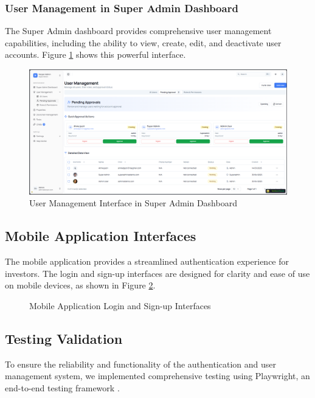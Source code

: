 \subsubsection{User Management in Super Admin Dashboard}
The Super Admin dashboard provides comprehensive user management capabilities, including the ability to view, create, edit, and deactivate user accounts. Figure \ref{fig:user-management} shows this powerful interface.
\newpage
\begin{figure}[htbp]
    \centering
    \includegraphics[width=1\textwidth]{images/user-management-dashboard.png}
    \caption{User Management Interface in Super Admin Dashboard}
    \label{fig:user-management}
\end{figure}

\subsection{Mobile Application Interfaces}
The mobile application provides a streamlined authentication experience for investors. The login and sign-up interfaces are designed for clarity and ease of use on mobile devices, as shown in Figure \ref{fig:mobile-auth-interfaces}.

\begin{figure}[htbp]
    \centering
    \caption{Mobile Application Login and Sign-up Interfaces}
    \label{fig:mobile-auth-interfaces}
\end{figure}
\newpage %

\subsection{Testing Validation}
To ensure the reliability and functionality of the authentication and user management system, we implemented comprehensive testing using Playwright, an end-to-end testing framework \cite{PlaywrightDocs2023}.

